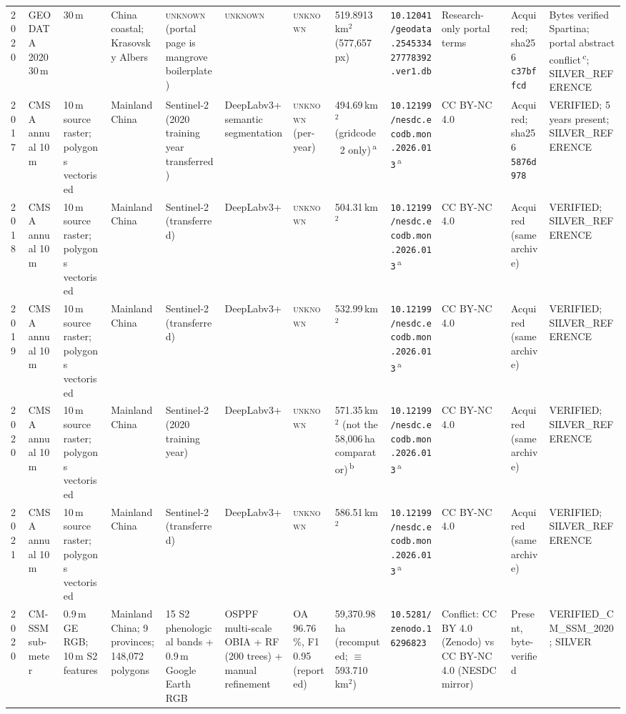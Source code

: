 \begin{table}
\begin{tabular}{p{0.9cm}p{1.75cm}p{1.2cm}p{1.7cm}p{2.55cm}p{2.7cm}p{1.75cm}p{1.7cm}p{1.95cm}p{1.7cm}p{1.7cm}p{1.85cm}}
2020 & GEODATA 2020 30\,m & 30\,m & China coastal; Krasovsky Albers & \textsc{unknown} (portal page is mangrove boilerplate) & \textsc{unknown} & \textsc{unknown} & 519.8913\,km$^2$ (577{,}657 px) & \nolinkurl{10.12041/geodata.254533427778392.ver1.db} & Research-only portal terms & Acquired; sha256 \texttt{c37bffcd} & Bytes verified Spartina; portal abstract conflict\,\textsuperscript{c}; SILVER\_REFERENCE \\
2017 & CMSA annual 10\,m & 10\,m source raster; polygons vectorised & Mainland China & Sentinel-2 (2020 training year transferred) & DeepLabv3+ semantic segmentation & \textsc{unknown} (per-year) & 494.69\,km$^2$ (gridcode~2 only)\,\textsuperscript{a} & \nolinkurl{10.12199/nesdc.ecodb.mon.2026.013}\,\textsuperscript{a} & CC BY-NC 4.0 & Acquired; sha256 \texttt{5876d978} & VERIFIED; 5 years present; SILVER\_REFERENCE \\
2018 & CMSA annual 10\,m & 10\,m source raster; polygons vectorised & Mainland China & Sentinel-2 (transferred) & DeepLabv3+ & \textsc{unknown} & 504.31\,km$^2$ & \nolinkurl{10.12199/nesdc.ecodb.mon.2026.013}\,\textsuperscript{a} & CC BY-NC 4.0 & Acquired (same archive) & VERIFIED; SILVER\_REFERENCE \\
2019 & CMSA annual 10\,m & 10\,m source raster; polygons vectorised & Mainland China & Sentinel-2 (transferred) & DeepLabv3+ & \textsc{unknown} & 532.99\,km$^2$ & \nolinkurl{10.12199/nesdc.ecodb.mon.2026.013}\,\textsuperscript{a} & CC BY-NC 4.0 & Acquired (same archive) & VERIFIED; SILVER\_REFERENCE \\
2020 & CMSA annual 10\,m & 10\,m source raster; polygons vectorised & Mainland China & Sentinel-2 (2020 training year) & DeepLabv3+ & \textsc{unknown} & 571.35\,km$^2$ (not the 58{,}006\,ha comparator)\,\textsuperscript{b} & \nolinkurl{10.12199/nesdc.ecodb.mon.2026.013}\,\textsuperscript{a} & CC BY-NC 4.0 & Acquired (same archive) & VERIFIED; SILVER\_REFERENCE \\
2021 & CMSA annual 10\,m & 10\,m source raster; polygons vectorised & Mainland China & Sentinel-2 (transferred) & DeepLabv3+ & \textsc{unknown} & 586.51\,km$^2$ & \nolinkurl{10.12199/nesdc.ecodb.mon.2026.013}\,\textsuperscript{a} & CC BY-NC 4.0 & Acquired (same archive) & VERIFIED; SILVER\_REFERENCE \\
2020 & CM-SSM sub-meter & 0.9\,m GE RGB; 10\,m S2 features & Mainland China; 9 provinces; 148{,}072 polygons & 15 S2 phenological bands + 0.9\,m Google Earth RGB & OSPPF multi-scale OBIA + RF (200 trees) + manual refinement & OA 96.76\,\%, F1 0.95 (reported) & 59{,}370.98\,ha (recomputed; $\equiv$593.710\,km$^2$) & \nolinkurl{10.5281/zenodo.16296823} & Conflict: CC BY 4.0 (Zenodo) vs CC BY-NC 4.0 (NESDC mirror) & Present, byte-verified & VERIFIED\_CM\_SSM\_2020; SILVER \\

\end{tabular}
\end{table}
